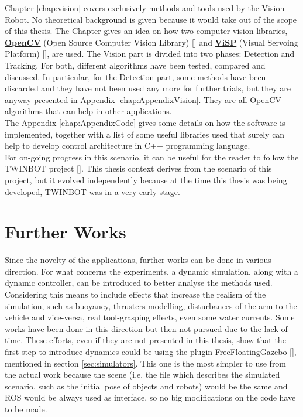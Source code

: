 Chapter \ref{chap:vision} covers exclusively methods and tools used by the Vision Robot. No theoretical background is given because it would take out of the scope of this thesis. The Chapter gives an idea on how two computer vision libraries, \href{https://opencv.org/}{\textbf{OpenCV}} (Open Source Computer Vision Library) [\cite{opencv}] and \href{https://visp.inria.fr/}{\textbf{ViSP}} (Visual Servoing Platform) [\cite{visp}], are used. The Vision part is divided into two phases: Detection and Tracking. For both, different algorithms have been tested, compared and discussed. 
In particular, for the Detection part, some methods have been discarded and they have not been used any more for further trials, but they are anyway presented in Appendix \ref{chap:AppendixVision}. They are all OpenCV algorithms that can help in other applications.\\
The Appendix \ref{chap:AppendixCode} gives some details on how the software is implemented, together with a list of some useful libraries used that surely can help to develop control architecture in C++ programming language.\\

For on-going progress in this scenario, it can be useful for the reader to follow the TWINBOT project [\cite{TWINBOT2019}]. This thesis context derives from the scenario of this project, but it evolved independently because at the time this thesis was being developed, TWINBOT was in a very early stage.


\section{Further Works}
Since the novelty of the applications, further works can be done in various direction. For what concerns the experiments, a dynamic simulation, along with a dynamic controller, can be introduced to better analyse the methods used. Considering this means to include effects that increase the realism of the simulation, such as buoyancy, thrusters modelling, disturbances of the arm to the vehicle and vice-versa, real tool-grasping effects, even some water currents. Some works have been done in this direction but then not pursued due to the lack of time. These efforts, even if they are not presented in this thesis, show that the first step to introduce dynamics could be using the plugin \href{https://github.com/freefloating-gazebo/freefloating_gazebo}{FreeFloatingGazebo} [\cite{freeFloatingGazebo}], mentioned in section \ref{sec:simulators}. This one is the most simpler to use from the actual work because the scene (i.e. the file which describes the simulated scenario, such as the initial pose of objects and robots) would be the same and ROS would be always used as interface, so no big modifications on the code have to be made.\\

